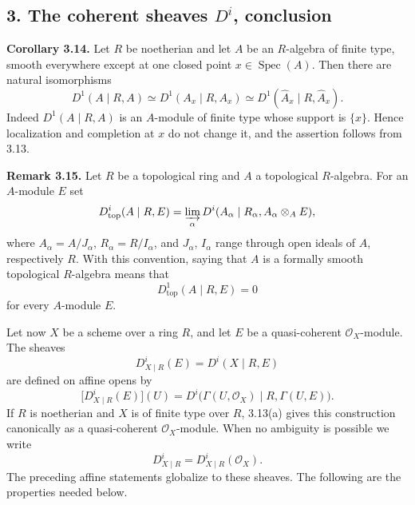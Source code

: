 \documentclass[11pt]{article}
\providecommand{\Spec}{\operatorname{Spec}}
\begin{document}
\subsection*{3. The coherent sheaves \(D^i\), conclusion}

\textbf{Corollary 3.14.} Let \(R\) be noetherian and let \(A\) be an \(R\)-algebra of finite type, smooth everywhere except at one closed point \(x\in\Spec(A)\). Then there are natural isomorphisms
\[
 D^1(A\mid R,A)\simeq D^1(A_x\mid R,A_x)
 \simeq D^1(\widehat A_x\mid R,\widehat A_x).
\]
Indeed \(D^1(A\mid R,A)\) is an \(A\)-module of finite type whose support is \(\{x\}\). Hence localization and completion at \(x\) do not change it, and the assertion follows from 3.13.

\textbf{Remark 3.15.} Let \(R\) be a topological ring and \(A\) a topological \(R\)-algebra. For an \(A\)-module \(E\) set
\[
 D^i_{\mathrm{top}}(A\mid R,E)=
 \varinjlim_{\alpha} D^i(A_\alpha\mid R_\alpha, A_\alpha\otimes_A E),
\]
where \(A_\alpha=A/J_\alpha\), \(R_\alpha=R/I_\alpha\), and \(J_\alpha\), \(I_\alpha\) range through open ideals of \(A\), respectively \(R\). With this convention, saying that \(A\) is a formally smooth topological \(R\)-algebra means that
\[
 D^1_{\mathrm{top}}(A\mid R,E)=0
\]
for every \(A\)-module \(E\).

Let now \(X\) be a scheme over a ring \(R\), and let \(E\) be a quasi-coherent \(\mathcal O_X\)-module. The sheaves
\[
 D^i_{X\mid R}(E)=D^i(X\mid R,E)
\]
are defined on affine opens by
\[
 \bigl[D^i_{X\mid R}(E)\bigr](U)=
 D^i\bigl(\Gamma(U,\mathcal O_X)\mid R,\Gamma(U,E)\bigr).
\]
If \(R\) is noetherian and \(X\) is of finite type over \(R\), 3.13(a) gives this construction canonically as a quasi-coherent \(\mathcal O_X\)-module. When no ambiguity is possible we write
\[
 D^i_{X\mid R}=D^i_{X\mid R}(\mathcal O_X).
\]
The preceding affine statements globalize to these sheaves. The following are the properties needed below.
\end{document}
